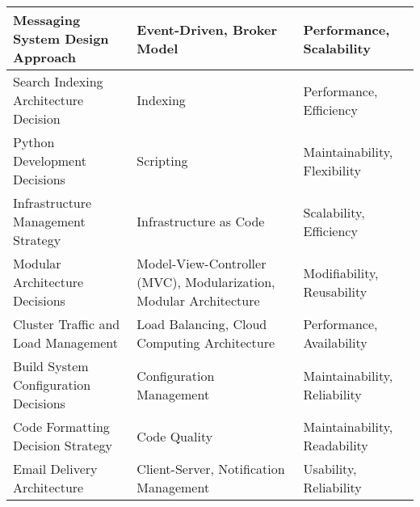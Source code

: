 {\begin{longtable}{|p{5cm}|p{6cm}|p{3cm}|}
        \hline
        Messaging System Design Approach & Event-Driven, Broker Model & Performance, Scalability \\
        \hline
        Search Indexing Architecture Decision & Indexing & Performance, Efficiency \\
        \hline
        Python Development Decisions & Scripting & Maintainability, Flexibility \\
        \hline
        Infrastructure Management Strategy & Infrastructure as Code & Scalability, Efficiency \\
        \hline
        Modular Architecture Decisions & Model-View-Controller (MVC), Modularization, Modular Architecture & Modifiability, Reusability \\
        \hline
        Cluster Traffic and Load Management & Load Balancing, Cloud Computing Architecture & Performance, Availability \\
        \hline
        Build System Configuration Decisions & Configuration Management & Maintainability, Reliability \\
        \hline
        Code Formatting Decision Strategy & Code Quality & Maintainability, Readability \\
        \hline
        Email Delivery Architecture & Client-Server, Notification Management & Usability, Reliability \\
        \hline
    \end{longtable}
}
